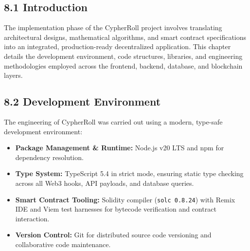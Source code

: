 \vspace{1.0cm}
\par
\label{chap:implementation}
\vspace{0.15cm}
\par
\vspace{0.3cm}

\subsection*{8.1 Introduction}
The implementation phase of the CypherRoll project involves translating architectural designs, mathematical algorithms, and smart contract specifications into an integrated, production-ready decentralized application. This chapter details the development environment, code structures, libraries, and engineering methodologies employed across the frontend, backend, database, and blockchain layers.

\subsection*{8.2 Development Environment}
The engineering of CypherRoll was carried out using a modern, type-safe development environment:
\begin{itemize}[leftmargin=1.5em]
    \item \textbf{Package Management \& Runtime:} Node.js v20 LTS and npm for dependency resolution.
    \item \textbf{Type System:} TypeScript 5.4 in strict mode, ensuring static type checking across all Web3 hooks, API payloads, and database queries.
    \item \textbf{Smart Contract Tooling:} Solidity compiler (\texttt{solc 0.8.24}) with Remix IDE and Viem test harnesses for bytecode verification and contract interaction.
    \item \textbf{Version Control:} Git for distributed source code versioning and collaborative code maintenance.
\end{itemize}

